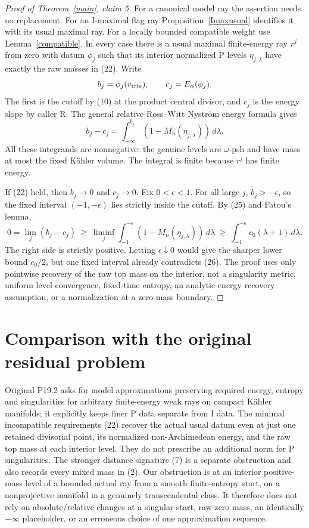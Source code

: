 \documentclass[11pt]{article}
\begin{document}
\begin{proof}[Proof of Theorem~\ref{main}, claim 5]
For a canonical model ray the assertion needs no replacement. For an
I-maximal flag ray Proposition~\ref{Imaxusual} identifies it with its
usual maximal ray. For a locally bounded compatible weight use
Lemma~\ref{compatible}. In every case there is a usual maximal
finite-energy ray $r^j$ from zero with datum $\phi_j$ such that its
interior normalized P levels $\eta_{j,\lambda}$ have exactly the
raw masses in (22). Write
\[
 b_j=\phi_j(v_{\rm triv}),\qquad c_j=E_\alpha(\phi_j).
\]
The first is the cutoff by (10) at the product central divisor, and
$c_j$ is the energy slope by caller R. The general relative
Ross--Witt Nystr\"om energy formula gives
\[
 b_j-c_j=\int_{-\infty}^{b_j}
                  (1-M_n(\eta_{j,\lambda}))\,d\lambda.     \tag{25}
\]
All these integrands are nonnegative: the genuine levels are
$\omega$-psh and have mass at most the fixed K\"ahler volume.
The integral is finite because $r^j$ has finite energy.

If (22) held, then $b_j\to0$ and $c_j\to0$. Fix
$0<\epsilon<1$. For all large $j$, $b_j>-\epsilon$, so the
fixed interval $(-1,-\epsilon)$ lies strictly inside the cutoff.
By (25) and Fatou's lemma,
\[
 0=\lim_j(b_j-c_j)\ \ge\
 \liminf_j\int_{-1}^{-\epsilon}
                   (1-M_n(\eta_{j,\lambda}))\,d\lambda
 \ \ge\ \int_{-1}^{-\epsilon}c_0(\lambda+1)\,d\lambda.
                                                               \tag{26}
\]
The right side is strictly positive. Letting $\epsilon\downarrow0$
would give the sharper lower bound $c_0/2$, but one fixed interval
already contradicts (26). The proof uses only pointwise recovery of
the raw top mass on the interior, not a singularity metric, uniform
level convergence, fixed-time entropy, an analytic-energy recovery
assumption, or a normalization at a zero-mass boundary.
\end{proof}

\section{Comparison with the original residual problem}
Original P19.2 asks for model approximations preserving required
energy, entropy and singularities for arbitrary finite-energy weak
rays on compact K\"ahler manifolds; it explicitly keeps finer P
data separate from I data. The minimal incompatible requirements (22) recover the actual usual
datum even at just one retained divisorial point, its normalized
non-Archimedean energy, and the raw top mass at each interior level.
They do not prescribe an additional norm for P singularities. The
stronger distance signature (7) is a separate obstruction and also
records every mixed mass in (2). Our obstruction is at an interior
positive-mass level of a bounded actual ray from a smooth finite-entropy
start, on a nonprojective manifold in a genuinely transcendental
class. It therefore does not rely on absolute/relative changes at a
singular start, raw zero mass, an identically $-\infty$ placeholder,
or an erroneous choice of one approximation sequence.
\end{document}
